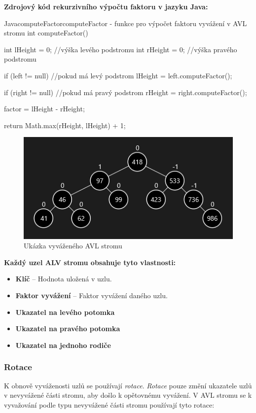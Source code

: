 \documentclass[
  biblatex=false,
  font=serif,
  glossaries=false,
  tables=false,
  theorems=false,
  index
]{kidiplom}
\begin{document}
\newpage\noindent \textbf{Zdrojový kód rekurzivního výpočtu faktoru v jazyku Java:}

\begin{kicode}{Java}{computeFactor}{computeFactor - funkce pro výpočet faktoru vyvážení v AVL stromu}
int computeFactor() {		
	int lHeight = 0; //výška levého podstromu
	int rHeight = 0; //výška pravého podstromu
		
	if (left != null) { //pokud má levý podstrom
		lHeight = left.computeFactor();
	}
		
	if (right != null) { //pokud má pravý podstrom
		rHeight = right.computeFactor();
	}		
		
	factor = lHeight - rHeight; 
		
	return Math.max(rHeight, lHeight) + 1;		
}
\end{kicode} 

\begin{figure}[h!]
\centering
	\includegraphics[scale=1]{obrazky/10AVLUkazka.png}
	\caption{Ukázka vyváženého AVL stromu}
\end{figure}


\noindent\textbf{Každý uzel ALV stromu obsahuje tyto vlastnosti:}
\begin{itemize}
\item \textbf{Klíč} -- Hodnota uložená v uzlu.
\item \textbf{Faktor vyvážení} -- Faktor vyvážení daného uzlu.
\item \textbf{Ukazatel na levého potomka}
\item \textbf{Ukazatel na pravého potomka}
\item \textbf{Ukazatel na jednoho rodiče}
\end{itemize}

\subsubsection{Rotace}
\indent\indent K obnově vyváženosti uzlů se používají \textit{rotace}. \textit{Rotace} pouze změní ukazatele uzlů v nevyvážené části stromu, aby došlo k opětovnému vyvážení. V AVL stromu se k vyvažování podle typu nevyvážené části stromu používají tyto rotace:\\
\end{document}
